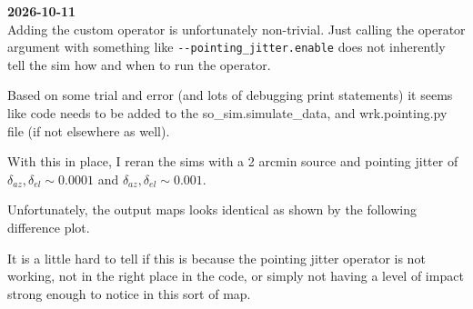 {\bf 2026-10-11}\\

Adding the custom operator is unfortunately non-trivial. Just calling the operator argument with something like \verb+--pointing_jitter.enable+ does not inherently tell the sim how and when to run the operator.

Based on some trial and error (and lots of debugging print statements) it seems like code needs to be added to the so\_sim.simulate\_data, and wrk.pointing.py file (if not elsewhere as well).

With this in place, I reran the sims with a 2 arcmin source and pointing jitter of $\delta_{az}, \delta_{el} \sim 0.0001$ and $\delta_{az}, \delta_{el} \sim 0.001$.

Unfortunately, the output maps looks identical as shown by the following difference plot.

It is a little hard to tell if this is because the pointing jitter operator is not working, not in the right place in the code, or simply not having a level of impact strong enough to notice in this sort of map.